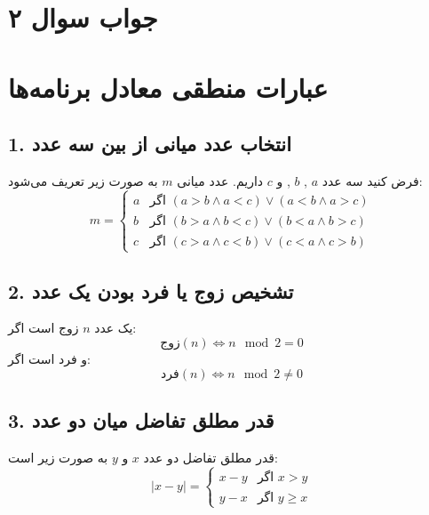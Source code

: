 \section*{جواب سوال ۲}

\section*{عبارات منطقی معادل برنامه‌ها}

\subsection*{1. انتخاب عدد میانی از بین سه عدد}
فرض کنید سه عدد \(a\) , \(b\) , و \(c\) داریم. عدد میانی \(m\) به صورت زیر تعریف می‌شود:
\[
m = \begin{cases} 
	a & \text{اگر } (a > b \land a < c) \lor (a < b \land a > c) \\
	b & \text{اگر } (b > a \land b < c) \lor (b < a \land b > c) \\
	c & \text{اگر } (c > a \land c < b) \lor (c < a \land c > b)
\end{cases}
\]

\subsection*{2. تشخیص زوج یا فرد بودن یک عدد}
یک عدد \(n\) زوج است اگر:
\[
\text{زوج}(n) \Leftrightarrow n \mod 2 = 0
\]
و فرد است اگر:
\[
\text{فرد}(n) \Leftrightarrow n \mod 2 \neq 0
\]

\subsection*{3. قدر مطلق تفاضل میان دو عدد}
قدر مطلق تفاضل دو عدد \(x\) و \(y\) به صورت زیر است:
\[
| x - y | = \begin{cases} 
	x - y & \text{اگر } x > y \\
	y - x & \text{اگر } y \geq x
\end{cases}
\]